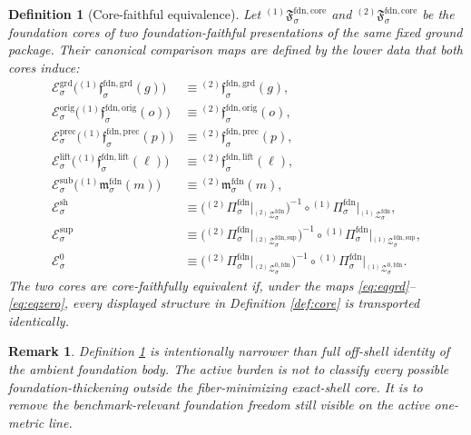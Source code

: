 \documentclass[11pt]{article}
\newcommand{\FoundProj}[1]{\Pi_{#1}^{\mathrm{fdn}}}
\newcommand{\FoundGroundMin}[1]{\mathfrak f_{#1}^{\mathrm{fdn,grd}}}
\newcommand{\FoundOrigMin}[1]{\mathfrak f_{#1}^{\mathrm{fdn,orig}}}
\newcommand{\FoundPrecMin}[1]{\mathfrak f_{#1}^{\mathrm{fdn,prec}}}
\newcommand{\FoundLiftMin}[1]{\mathfrak f_{#1}^{\mathrm{fdn,lift}}}
\newcommand{\FoundSubMin}[1]{\mathfrak m_{#1}^{\mathrm{fdn}}}
\newcommand{\FoundShellSet}[1]{\mathcal Z_{#1}^{\mathrm{fdn}}}
\newcommand{\FoundSupportShell}[1]{\mathcal Z_{#1}^{\mathrm{fdn,sup}}}
\newcommand{\FoundZeroCore}[1]{\mathcal Z_{#1}^{0,\mathrm{fdn}}}
\newcommand{\FoundCore}[1]{\mathfrak F_{#1}^{\mathrm{fdn,core}}}
\newcommand{\CoreMapGround}[1]{\mathcal E_{#1}^{\mathrm{grd}}}
\newcommand{\CoreMapOrig}[1]{\mathcal E_{#1}^{\mathrm{orig}}}
\newcommand{\CoreMapPrec}[1]{\mathcal E_{#1}^{\mathrm{prec}}}
\newcommand{\CoreMapLift}[1]{\mathcal E_{#1}^{\mathrm{lift}}}
\newcommand{\CoreMapSub}[1]{\mathcal E_{#1}^{\mathrm{sub}}}
\newcommand{\CoreMapShell}[1]{\mathcal E_{#1}^{\mathrm{sh}}}
\newcommand{\CoreMapSupport}[1]{\mathcal E_{#1}^{\mathrm{sup}}}
\newcommand{\CoreMapZero}[1]{\mathcal E_{#1}^{0}}
\newtheorem{definition}{Definition}
\newtheorem{remark}{Remark}
\begin{document}
\begin{definition}[Core-faithful equivalence]
\label{def:equiv}
Let \({}^{(1)}\!\FoundCore{\sigma}\) and \({}^{(2)}\!\FoundCore{\sigma}\) be the foundation cores of two foundation-faithful presentations of the same fixed ground package. Their canonical comparison maps are defined by the lower data that both cores induce:
\begin{align}
\CoreMapGround{\sigma}\bigl({}^{(1)}\!\FoundGroundMin{\sigma}(g)\bigr)
&\equiv
{}^{(2)}\!\FoundGroundMin{\sigma}(g),
\label{eq:eqgrd}
\\
\CoreMapOrig{\sigma}\bigl({}^{(1)}\!\FoundOrigMin{\sigma}(o)\bigr)
&\equiv
{}^{(2)}\!\FoundOrigMin{\sigma}(o),
\label{eq:eqorig}
\\
\CoreMapPrec{\sigma}\bigl({}^{(1)}\!\FoundPrecMin{\sigma}(p)\bigr)
&\equiv
{}^{(2)}\!\FoundPrecMin{\sigma}(p),
\label{eq:eqprec}
\\
\CoreMapLift{\sigma}\bigl({}^{(1)}\!\FoundLiftMin{\sigma}(\ell)\bigr)
&\equiv
{}^{(2)}\!\FoundLiftMin{\sigma}(\ell),
\label{eq:eqlift}
\\
\CoreMapSub{\sigma}\bigl({}^{(1)}\!\FoundSubMin{\sigma}(m)\bigr)
&\equiv
{}^{(2)}\!\FoundSubMin{\sigma}(m),
\label{eq:eqsub}
\\
\CoreMapShell{\sigma}
&\equiv
\bigl({}^{(2)}\!\FoundProj{\sigma}\big|_{{}^{(2)}\!\FoundShellSet{\sigma}}\bigr)^{-1}
\circ
{}^{(1)}\!\FoundProj{\sigma}\big|_{{}^{(1)}\!\FoundShellSet{\sigma}},
\label{eq:eqshell}
\\
\CoreMapSupport{\sigma}
&\equiv
\bigl({}^{(2)}\!\FoundProj{\sigma}\big|_{{}^{(2)}\!\FoundSupportShell{\sigma}}\bigr)^{-1}
\circ
{}^{(1)}\!\FoundProj{\sigma}\big|_{{}^{(1)}\!\FoundSupportShell{\sigma}},
\label{eq:eqsupport}
\\
\CoreMapZero{\sigma}
&\equiv
\bigl({}^{(2)}\!\FoundProj{\sigma}\big|_{{}^{(2)}\!\FoundZeroCore{\sigma}}\bigr)^{-1}
\circ
{}^{(1)}\!\FoundProj{\sigma}\big|_{{}^{(1)}\!\FoundZeroCore{\sigma}}.
\label{eq:eqzero}
\end{align}
The two cores are \emph{core-faithfully equivalent} if, under the maps \eqref{eq:eqgrd}--\eqref{eq:eqzero}, every displayed structure in Definition \ref{def:core} is transported identically.
\end{definition}

\begin{remark}
Definition \ref{def:equiv} is intentionally narrower than full off-shell identity of the ambient foundation body. The active burden is not to classify every possible foundation-thickening outside the fiber-minimizing exact-shell core. It is to remove the benchmark-relevant foundation freedom still visible on the active one-metric line.
\end{remark}
\end{document}
